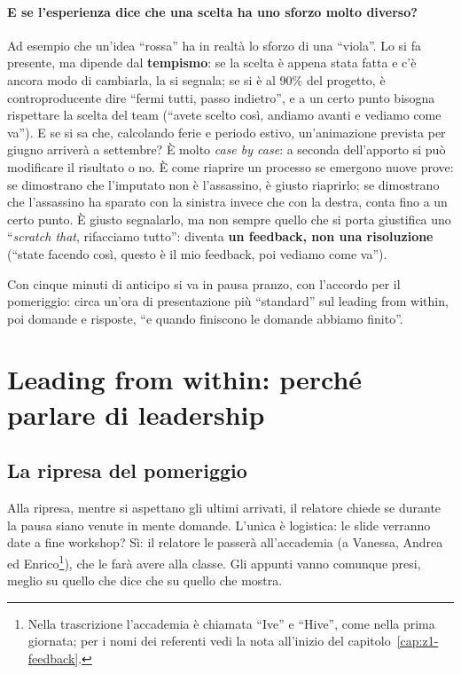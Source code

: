 \paragraph{E se l'esperienza dice che una scelta ha uno sforzo molto diverso?} Ad esempio
che un'idea ``rossa'' ha in realtà lo sforzo di una ``viola''. Lo si fa presente, ma dipende dal
\textbf{tempismo}: se la scelta è appena stata fatta e c'è ancora modo di cambiarla, la si
segnala; se si è al 90\% del progetto, è controproducente dire ``fermi tutti, passo
indietro'', e a un certo punto bisogna rispettare la scelta del team (``avete scelto così,
andiamo avanti e vediamo come va''). E se si sa che, calcolando ferie e periodo estivo,
un'animazione prevista per giugno arriverà a settembre? È molto \emph{case by case}: a
seconda dell'apporto si può modificare il risultato o no. È come riaprire un processo se
emergono nuove prove: se dimostrano che l'imputato non è l'assassino, è giusto riaprirlo; se
dimostrano che l'assassino ha sparato con la sinistra invece che con la destra, conta fino a
un certo punto. È giusto segnalarlo, ma non sempre quello che si porta giustifica uno
``\emph{scratch that}, rifacciamo tutto'': diventa \textbf{un feedback, non una risoluzione}
(``state facendo così, questo è il mio feedback, poi vediamo come va'').

Con cinque minuti di anticipo si va in pausa pranzo, con l'accordo per il pomeriggio: circa
un'ora di presentazione più ``standard'' sul leading from within, poi domande e risposte,
``e quando finiscono le domande abbiamo finito''.

\section{Leading from within: perché parlare di leadership}
\label{sec:z2-leadership}

\subsection{La ripresa del pomeriggio}

Alla ripresa, mentre si aspettano gli ultimi arrivati, il relatore chiede se durante la
pausa siano venute in mente domande. L'unica è logistica: le slide verranno date a fine
workshop? Sì: il relatore le passerà all'accademia (a Vanessa, Andrea ed
Enrico\footnote{Nella trascrizione l'accademia è chiamata ``Ive'' e ``Hive'', come nella
prima giornata; per i nomi dei referenti vedi la nota all'inizio del
capitolo~\ref{cap:z1-feedback}.}), che le farà avere alla classe. Gli appunti vanno
comunque presi, meglio su quello che dice che su quello che mostra.

